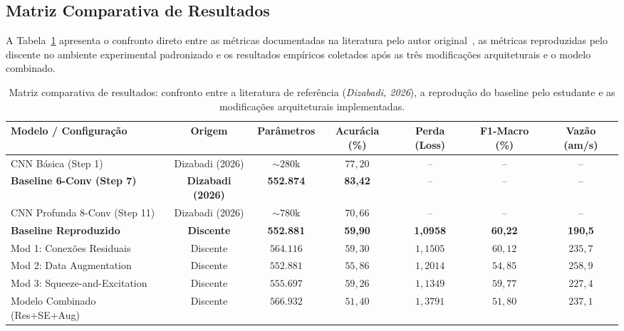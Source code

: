\documentclass[runningheads]{llncs}
\begin{document}
\subsection{Matriz Comparativa de Resultados}
A Tabela~\ref{tab:comparativo} apresenta o confronto direto entre as m\'{e}tricas documentadas na literatura pelo autor original~\cite{dizabadi2026empirical}, as m\'{e}tricas reproduzidas pelo discente no ambiente experimental padronizado e os resultados emp\'{i}ricos coletados ap\'{o}s as tr\^{e}s modifica\c{c}\~{o}es arquiteturais e o modelo combinado.

\begin{table}[t]
\centering
\caption{Matriz comparativa de resultados: confronto entre a literatura de refer\^{e}ncia (\textit{Dizabadi, 2026}), a reprodu\c{c}\~{a}o do baseline pelo estudante e as modifica\c{c}\~{o}es arquiteturais implementadas.}
\label{tab:comparativo}
\setlength{\tabcolsep}{4pt}
\small
\begin{tabular}{lcccccc}
\toprule
\textbf{Modelo / Configura\c{c}\~{a}o} & \textbf{Origem} & \textbf{Par\^{a}metros} & \textbf{Acur\'{a}cia (\%)} & \textbf{Perda (Loss)} & \textbf{F1-Macro (\%)} & \textbf{Vaz\~{a}o (am/s)} \\
\midrule
CNN B\'{a}sica (Step 1) & Dizabadi (2026) & $\sim 280\text{k}$ & $77{,}20$ & -- & -- & -- \\
\textbf{Baseline 6-Conv (Step 7)} & \textbf{Dizabadi (2026)} & \textbf{552.874} & \textbf{83,42} & -- & -- & -- \\
CNN Profunda 8-Conv (Step 11) & Dizabadi (2026) & $\sim 780\text{k}$ & $70{,}66$ & -- & -- & -- \\
\midrule
\textbf{Baseline Reproduzido} & \textbf{Discente} & \textbf{552.881} & \textbf{59,90} & \textbf{1,0958} & \textbf{60,22} & \textbf{190,5} \\
Mod 1: Conex\~{o}es Residuais & Discente & $564.116$ & $59{,}30$ & $1{,}1505$ & $60{,}12$ & $235{,}7$ \\
Mod 2: Data Augmentation & Discente & $552.881$ & $55{,}86$ & $1{,}2014$ & $54{,}85$ & $258{,}9$ \\
Mod 3: Squeeze-and-Excitation & Discente & $555.697$ & $59{,}26$ & $1{,}1349$ & $59{,}77$ & $227{,}4$ \\
Modelo Combinado (Res+SE+Aug) & Discente & $566.932$ & $51{,}40$ & $1{,}3791$ & $51{,}80$ & $237{,}1$ \\
\bottomrule
\end{tabular}
\end{table}
\end{document}
